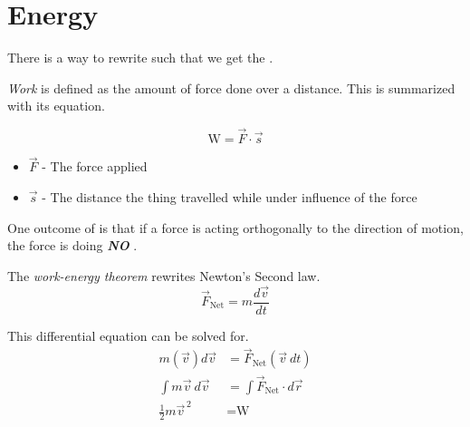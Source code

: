 \section{Energy} \label{sec:Energy}
There is a way to rewrite  such that we get the .

\begin{definition}[Work] \label{def:Work}
  \emph{Work} is defined as the amount of force done over a distance.
  This is summarized with its equation.

  \begin{equation} \label{eq:Work}
    \text{W} = \vec{F} \cdot \vec{s}
  \end{equation}
  \begin{itemize}[noitemsep, nolistsep]
    \item $\vec{F}$ - The force applied
    \item $\vec{s}$ - The distance the thing travelled while under influence of the force
  \end{itemize}

  \begin{remark}
    One outcome of  is that if a force is acting orthogonally to the direction of motion, the force is doing \textbf{\emph{NO}} .
  \end{remark}
\end{definition}

\begin{definition} \label{def:Work Kinetic Energy Theorem}
  The \emph{work-energy theorem} rewrites Newton's Second law.
  \begin{equation*}
    \vec{F}_{\text{Net}} = m \frac{d \vec{v}}{dt}
  \end{equation*}

  This differential equation can be solved for.
  \begin{align*}
    m \left( \vec{v} \right) d \vec{v} &= \vec{F}_{\text{Net}} \left( \vec{v} \: dt \right) \\
    \int m \vec{v} \: d \vec{v} &= \int \vec{F}_{\text{Net}} \cdot d \vec{r} \\ %
    \frac{1}{2} m \vec{v}^{\,2} &= \text{W} %
  \end{align*}
\end{definition}

